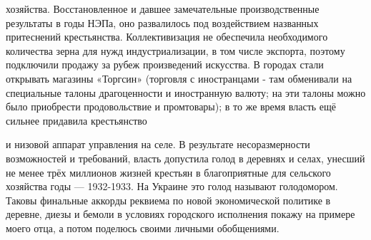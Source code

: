 \label{120-1}
хозяйства. Восстановленное и давшее замечательные производственные результаты в годы НЭПа, оно развалилось под воздействием названных притеснений крестьянства. Коллективизация не обеспечила необходимого количества зерна для нужд индустриализации, в том числе экспорта, поэтому подключили продажу за рубеж произведений искусства. В городах стали открывать магазины «Торгсин» (торговля с иностранцами - там обменивали на специальные талоны драгоценности и иностранную валюту; на эти талоны можно было приобрести продовольствие и промтовары); в то же время власть ещё сильнее придавила крестьянство

\label{121-1}
и низовой аппарат управления на селе. В результате несоразмерности возможностей и  требований, власть допустила голод в деревнях и селах, унесший не менее трёх миллионов жизней крестьян в благоприятные для сельского хозяйства годы — 1932-1933. На Украине это голод называют голодомором. Таковы финальные аккорды реквиема по новой экономической политике в деревне, диезы и бемоли в условиях городского исполнения покажу на примере моего отца, а потом поделюсь своими личными обобщениями.